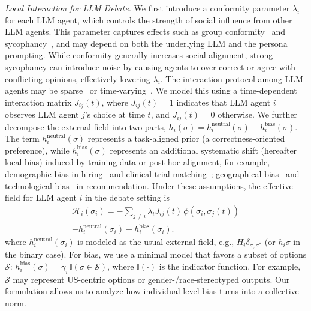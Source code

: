 \documentclass{article}
\theoremstyle{plain}
\theoremstyle{definition}
\theoremstyle{remark}
\begin{document}
{\sl Local Interaction for LLM Debate. }
We first introduce a conformity parameter $\lambda_i$ for each LLM agent, which controls the strength of social influence from other LLM agents.
This parameter captures effects such as group conformity~\cite{choi2025empirical} and sycophancy~\cite{zheng2023judging}, and may depend on both the underlying LLM and the persona prompting. While conformity generally increases social alignment, strong sycophancy can introduce noise by causing agents to over-correct or agree with conflicting opinions, effectively lowering $\lambda_i$.
The interaction protocol among LLM agents may be sparse~\cite{li-etal-2024-improving-multi} or time-varying~\cite{chen2023agentverse}.
We model this using a time-dependent interaction matrix $J_{ij}(t)$, where $J_{ij}(t)=1$ indicates that LLM agent $i$ observes LLM agent $j$'s choice at time $t$, and $J_{ij}(t)=0$ otherwise. 
We further decompose the external field into two parts,
\(
h_i(\sigma)=h_i^{\mathrm{neutral}}(\sigma)+h_i^{\mathrm{bias}}(\sigma).
\)
The term \(h_i^{\mathrm{neutral}}(\sigma)\) represents a task-aligned prior (a correctness-oriented preference),
while \(h_i^{\mathrm{bias}}(\sigma)\) represents an additional systematic shift (hereafter local bias) induced by training data or post hoc alignment, for example,  
demographic bias in hiring~\cite{wilson2025gender} and clinical trial matching~\cite{ji2025mitigating}; geographical bias~\cite{manvi2024geographical} and technological bias~\cite{winder2025biased} in recommendation.  
Under these assumptions, the effective field for LLM agent $i$ in the debate setting is
\begin{align}\label{eq:llm-effective-field}
\mathcal{H}_i(\sigma_i)
= - \sum_{j \neq i} \lambda_i J_{ij}(t)\, \phi\!\left(\sigma_i, \sigma_j(t)\right) \\ \nonumber
- h_i^{\mathrm{neutral}}(\sigma_i) - h_i^{\mathrm{bias}}(\sigma_i).
\end{align}
where \(h_i^{\mathrm{neutral}}(\sigma_i)\) is modeled as the usual external field, e.g.,
\(H_i \delta_{\sigma,\sigma^\ast}\) (or \(h_i \sigma\) in the binary case). 
For bias, we use a minimal model that favors a subset of options \(\mathcal{S}\):
$h_i^{\mathrm{bias}}(\sigma)=\gamma_i\,\mathbb{I}(\sigma\in\mathcal{S})$, where $\mathbb{I}(\cdot)$ is the indicator function. 
For example, $\mathcal{S}$ may represent US-centric options or gender-/race-stereotyped outputs. 
Our formulation allows us to analyze how individual-level bias turns into a collective norm. 
\end{document}

